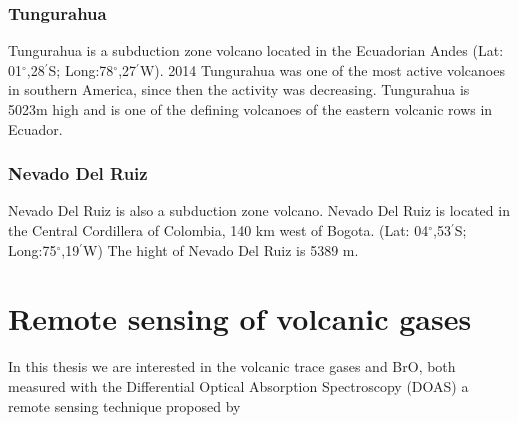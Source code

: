 \documentclass  [
  paper    = a4,
  BCOR     = 10mm,
  twoside,
  fontsize = 12pt,
  fleqn,
  toc      = bibnumbered,
  toc      = listofnumbered,
  numbers  = noendperiod,
  headings = normal,
  listof   = leveldown,
  version  = 3.03
]                                       {scrreprt}
\begin{document}
	
	
	
	
	
	
	
	
	
	
	
	
	

	\subsection*{Tungurahua}
	Tungurahua is a subduction zone volcano located in the Ecuadorian Andes (Lat: 01$^{\circ}$,28$^{'}$S; Long:78$^{\circ}$,27$^{'}$W). 2014 Tungurahua was one of the most active volcanoes in southern America, since then the activity was decreasing. Tungurahua is 5023m high and is one of the defining volcanoes of the eastern volcanic rows in Ecuador. \cite{hall1999tungurahua}
		
	\subsection*{Nevado Del Ruiz}
	Nevado Del Ruiz is also a subduction zone volcano. 	Nevado Del Ruiz  is located in the Central Cordillera of Colombia, 140 km west of Bogota.
	(Lat: 04$^{\circ}$,53$^{'}$S; Long:75$^{\circ}$,19$^{'}$W) 
	The hight of Nevado Del Ruiz is 5389 m.
	 
	\chapter{Remote sensing of volcanic gases}
	In this thesis we are interested in the volcanic trace gases  and BrO, both measured with the Differential Optical Absorption Spectroscopy (DOAS) a remote sensing technique proposed by \cite{platt2008differential}\\
	
\end{document}
